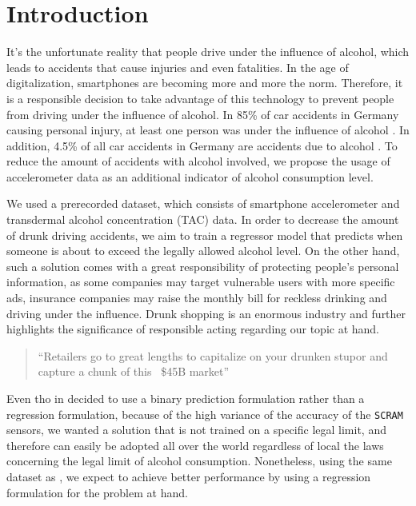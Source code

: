 \section{Introduction}

It's the unfortunate reality that people drive under the influence of alcohol, which leads to accidents that cause injuries and even fatalities. In the age of digitalization, smartphones are becoming more and more the norm. 
Therefore, it is a responsible decision to take advantage of this technology to prevent people from driving under the influence of alcohol.
In 85\% of car accidents in Germany causing personal injury, at least one person was under the influence of alcohol \cite{destatis}.
In addition, 4.5\% of all car accidents in Germany are accidents due to alcohol \cite{statista}.
To reduce the amount of accidents with alcohol involved, we propose the usage of accelerometer data as an additional indicator  of alcohol consumption level.

We used a prerecorded dataset, which consists of smartphone accelerometer and transdermal alcohol concentration (TAC) data.
In order to decrease the amount of drunk driving accidents, we aim to train a regressor model that predicts when someone is about to exceed the legally allowed alcohol level.
On the other hand, such a solution comes with a great responsibility of protecting people's personal information, as some companies may target vulnerable users with more specific ads, insurance companies may raise the monthly bill for reckless drinking and driving under the influence.
Drunk shopping is an enormous industry and further highlights the significance of responsible acting regarding our topic at hand.
\begin{quote}
	``Retailers go to great lengths to capitalize on your drunken stupor and capture a chunk of this ~\$45B market'' \cite{hustle}
\end{quote}

Even tho \citeauthor{DBLP:conf/ijcai/KillianPNMC19} in \cite{DBLP:conf/ijcai/KillianPNMC19} decided to use a binary prediction formulation rather than a regression formulation, because of the high variance of the accuracy of the \texttt{SCRAM} sensors, we wanted a solution that is not trained on a specific legal limit, and therefore can easily be adopted all over the world regardless of local the laws concerning the legal limit of alcohol consumption. Nonetheless, using the same dataset as \citeauthor{DBLP:conf/ijcai/KillianPNMC19}, we expect to achieve better performance by using a regression formulation for the problem at hand.